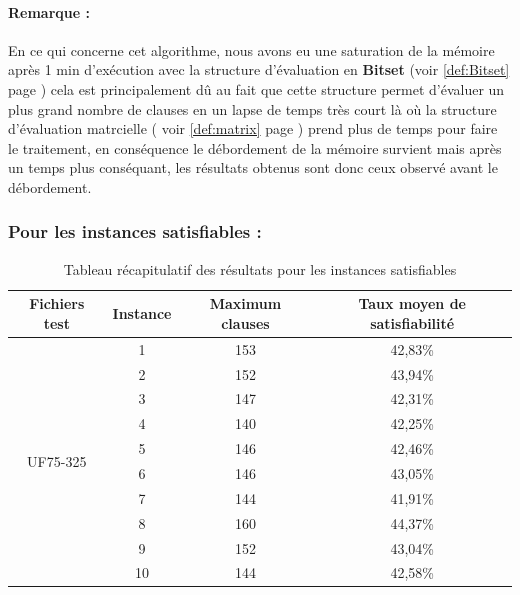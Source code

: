 \paragraph{Remarque :} \label{BreadthIssueExperience} En ce qui concerne cet algorithme, nous avons eu une saturation de la mémoire après 1 min d'exécution avec la structure d'évaluation en \textbf{Bitset} (voir \ref*{def:Bitset} page \pageref{def:Bitset}) cela est principalement dû au fait que cette structure permet d'évaluer un plus grand nombre de clauses en un lapse de temps  très court là où la structure d'évaluation matrcielle ( voir \ref{def:matrix} page \pageref{def:matrix}) prend plus de temps pour faire le traitement, en conséquence le débordement de la mémoire survient mais après un temps plus conséquant, les résultats obtenus sont donc ceux observé avant le débordement.
\subsubsection{Pour les instances satisfiables :}
\begin{table}[H]
	\centering
	\label{table:Tab_BFS_Sat}
	\begin{tabular}{|c|c|c|c|}
		\hline
		Fichiers test              & Instance & Maximum clauses & Taux  moyen de satisfiabilité \\ \hline
		\multirow{10}{*}{UF75-325} & 1        & 153             & 42,83\%                       \\ \cline{2-4} 
		& 2        & 152             & 43,94\%                       \\ \cline{2-4} 
		& 3        & 147             & 42,31\%                       \\ \cline{2-4} 
		& 4        & 140             & 42,25\%                       \\ \cline{2-4} 
		& 5        & 146             & 42,46\%                       \\ \cline{2-4} 
		& 6        & 146             & 43,05\%                       \\ \cline{2-4} 
		& 7        & 144             & 41,91\%                       \\ \cline{2-4} 
		& 8        & 160             & 44,37\%                       \\ \cline{2-4} 
		& 9        & 152             & 43,04\%                       \\ \cline{2-4} 
		& 10       & 144             & 42,58\%                       \\ \hline
	\end{tabular}
	\caption{Tableau récapitulatif des résultats pour les instances satisfiables}
\end{table}
